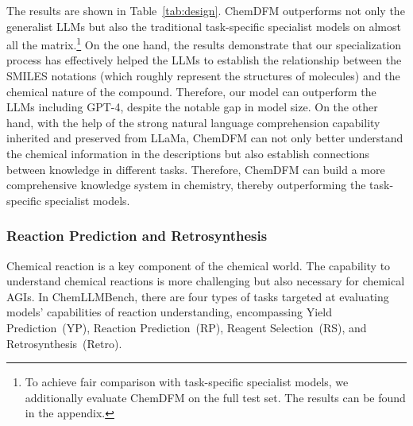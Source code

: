 The results are shown in Table~\ref{tab:design}. ChemDFM outperforms not only the generalist LLMs but also the traditional task-specific specialist models on almost all the matrix.\footnote{To achieve fair comparison with task-specific specialist models, we additionally evaluate ChemDFM on the full test set. The results can be found in the appendix.} On the one hand, the results demonstrate that our specialization process has effectively helped the LLMs to establish the relationship between the SMILES notations (which roughly represent the structures of molecules) and the chemical nature of the compound. Therefore, our model can outperform the LLMs including GPT-4, despite the notable gap in model size.
On the other hand, with the help of the strong natural language comprehension capability inherited and preserved from LLaMa, ChemDFM can not only better understand the chemical information in the descriptions but also establish connections between knowledge in different tasks. Therefore, ChemDFM can build a more comprehensive knowledge system in chemistry, thereby outperforming the task-specific specialist models.

\subsubsection{Reaction Prediction and Retrosynthesis}\label{reaction}

Chemical reaction is a key component of the chemical world. The capability to understand chemical reactions is more challenging but also necessary for chemical AGIs.
In ChemLLMBench, there are four types of tasks targeted at evaluating models' capabilities of reaction understanding, 
encompassing Yield Prediction~(YP), Reaction Prediction~(RP), Reagent Selection~(RS), and Retrosynthesis~(Retro).

